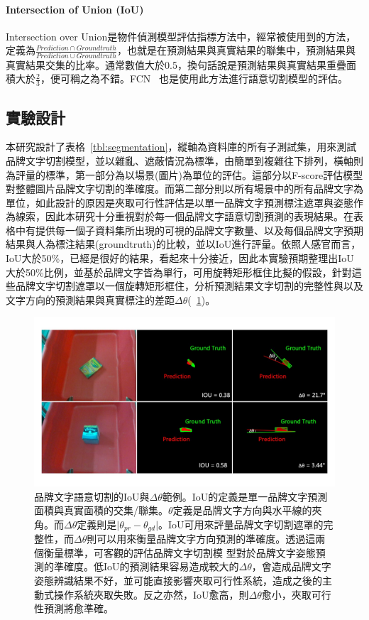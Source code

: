 \paragraph{Intersection of Union (IoU)}
Intersection over Union是物件偵測模型評估指標方法中，經常被使用到的方法，定義為$\frac{Prediction \cap  Groundtruth}{Prediction \cup  Groundtruth}$，也就是在預測結果與真實結果的聯集中，預測結果與真實結果交集的比率。通常數值大於0.5，換句話說是預測結果與真實結果重疊面積大於$\frac{2}{3}$，便可稱之為不錯。FCN ~\cite{long2015fully}也是使用此方法進行語意切割模型的評估。

\subsection{實驗設計}

本研究設計了表格~\ref{tbl:segmentation}，縱軸為資料庫的所有子測試集，用來測試品牌文字切割模型，並以雜亂、遮蔽情況為標準，由簡單到複雜往下排列，橫軸則為評量的標準，第一部分為以場景(圖片)為單位的評估。這部分以F-score評估模型對整體圖片品牌文字切割的準確度。而第二部分則以所有場景中的所有品牌文字為單位，如此設計的原因是夾取可行性評估是以單一品牌文字預測標注遮罩與姿態作為線索，因此本研究十分重視對於每一個品牌文字語意切割預測的表現結果。在表格中有提供每一個子資料集所出現的可視的品牌文字數量、以及每個品牌文字預期結果與人為標注結果(groundtruth)的比較，並以IoU進行評量。依照人感官而言，IoU大於50\%，已經是很好的結果，看起來十分接近，因此本實驗預期整理出IoU大於50\%比例，並基於品牌文字皆為單行，可用旋轉矩形框住比擬的假設，針對這些品牌文字切割遮罩以一個旋轉矩形框住，分析預測結果文字切割的完整性與以及文字方向的預測結果與真實標注的差距$\Delta\theta$(~\ref{figure:iou_deltatheta})。

\begin{figure}[H]
	\centering
	\includegraphics[height=!, width=1.0\linewidth, keepaspectratio=true]
	{./figures/iou_deltatheta.jpg}
  \caption{品牌文字語意切割的IoU與$\Delta\theta$範例。IoU的定義是單一品牌文字預測面積與真實面積的交集/聯集。$\theta$定義是品牌文字方向與水平線的夾角。而$\Delta\theta$定義則是$\lvert\theta_{pr}-\theta_{gd}\rvert$。IoU可用來評量品牌文字切割遮罩的完整性，而$\Delta\theta$則可以用來衡量品牌文字方向預測的準確度。透過這兩個衡量標準，可客觀的評估品牌文字切割模
型對於品牌文字姿態預測的準確度。低IoU的預測結果容易造成較大的$\Delta\theta$，會造成品牌文字姿態辨識結果不好，並可能直接影響夾取可行性系統，造成之後的主動式操作系統夾取失敗。反之亦然，IoU愈高，則$\Delta\theta$愈小，夾取可行性預測將愈準確。}
  \label{figure:iou_deltatheta}
\end{figure}

